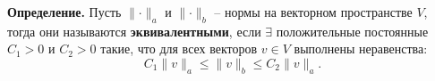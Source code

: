 \documentclass[12pt, a4paper]{article}
\newcommand{\norm}[1]{\lVert #1 \rVert}
\begin{document}
\begin{enumerate}
	\textbf{Определение.} Пусть $\norm{\cdot}_a$ и $\norm{\cdot}_b$ -- нормы на векторном пространстве $V$, тогда они называются \textbf{эквивалентными}, если $\exists$ положительные постоянные $C_1 > 0$ и $C_2 > 0$ такие, что для всех векторов $v \in V$ выполнены неравенства:
	\begin{equation*}
		C_1 \norm{v}_a \leq \norm{v}_b \leq C_2 \norm{v}_a.
	\end{equation*}
	
	\clearpage
	\end{enumerate}
	
\end{document}

